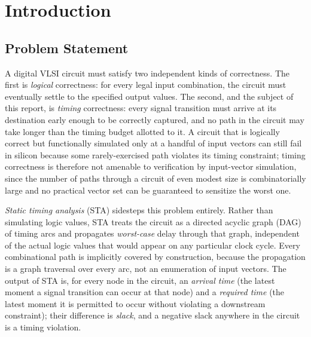 \chapter{Introduction}
\label{ch:introduction}

\section{Problem Statement}
\label{sec:intro-problem}

A digital VLSI circuit must satisfy two independent kinds of correctness.
The first is \emph{logical} correctness: for every legal input combination,
the circuit must eventually settle to the specified output values. The
second, and the subject of this report, is \emph{timing} correctness: every
signal transition must arrive at its destination early enough to be
correctly captured, and no path in the circuit may take longer than the
timing budget allotted to it. A circuit that is logically correct but
functionally simulated only at a handful of input vectors can still fail in
silicon because some rarely-exercised path violates its timing constraint;
timing correctness is therefore not amenable to verification by input-vector
simulation, since the number of paths through a circuit of even modest size
is combinatorially large and no practical vector set can be guaranteed to
sensitize the worst one.

\emph{Static timing analysis} (STA) sidesteps this problem entirely. Rather
than simulating logic values, STA treats the circuit as a directed acyclic
graph (DAG) of timing arcs and propagates \emph{worst-case} delay through
that graph, independent of the actual logic values that would appear on any
particular clock cycle. Every combinational path is implicitly covered by
construction, because the propagation is a graph traversal over every arc,
not an enumeration of input vectors. The output of STA is, for every node in
the circuit, an \emph{arrival time} (the latest moment a signal transition
can occur at that node) and a \emph{required time} (the latest moment it is
permitted to occur without violating a downstream constraint); their
difference is \emph{slack}, and a negative slack anywhere in the circuit is
a timing violation.

